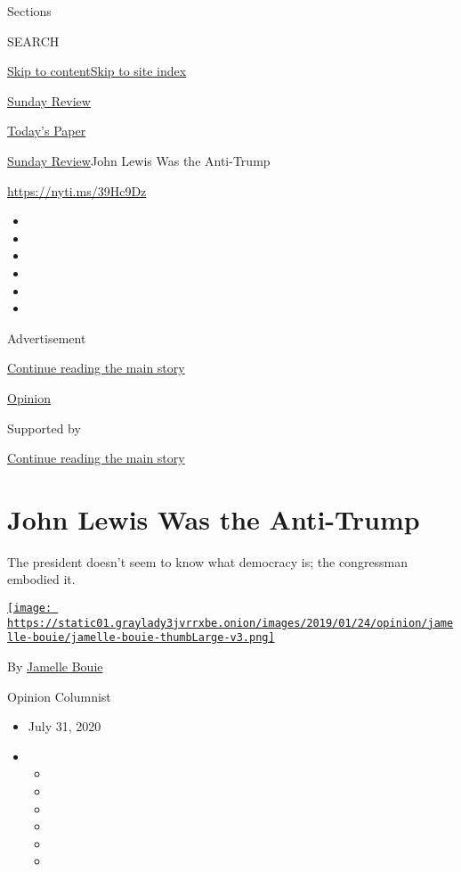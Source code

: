 Sections

SEARCH

\protect\hyperlink{site-content}{Skip to
content}\protect\hyperlink{site-index}{Skip to site index}

\href{https://www.nytimes3xbfgragh.onion/section/opinion/sunday}{Sunday
Review}

\href{https://myaccount.nytimes3xbfgragh.onion/auth/login?response_type=cookie\&client_id=vi}{}

\href{https://www.nytimes3xbfgragh.onion/section/todayspaper}{Today's
Paper}

\href{/section/opinion/sunday}{Sunday Review}\textbar{}John Lewis Was
the Anti-Trump

\url{https://nyti.ms/39Hc9Dz}

\begin{itemize}
\item
\item
\item
\item
\item
\item
\end{itemize}

Advertisement

\protect\hyperlink{after-top}{Continue reading the main story}

\href{/section/opinion}{Opinion}

Supported by

\protect\hyperlink{after-sponsor}{Continue reading the main story}

\hypertarget{john-lewis-was-the-anti-trump}{%
\section{John Lewis Was the
Anti-Trump}\label{john-lewis-was-the-anti-trump}}

The president doesn't seem to know what democracy is; the congressman
embodied it.

\href{https://www.nytimes3xbfgragh.onion/column/jamelle-bouie}{\texttt{[image: https://static01.graylady3jvrrxbe.onion/images/2019/01/24/opinion/jamelle-bouie/jamelle-bouie-thumbLarge-v3.png]}}

By
\href{https://www.nytimes3xbfgragh.onion/column/jamelle-bouie}{Jamelle
Bouie}

Opinion Columnist

\begin{itemize}
\item
  July 31, 2020
\item
  \begin{itemize}
  \item
  \item
  \item
  \item
  \item
  \item
  \end{itemize}
\end{itemize}

